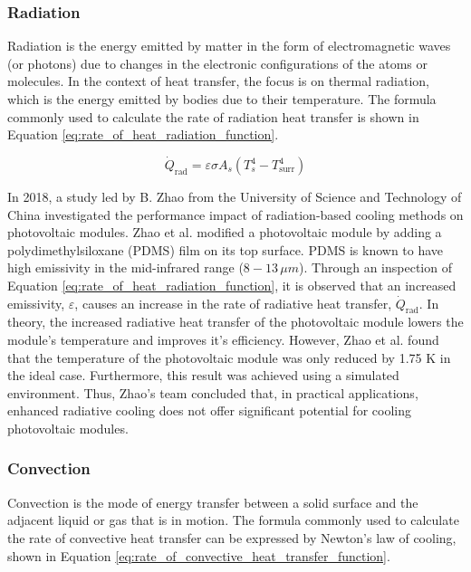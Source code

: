 \subsubsection{Radiation}
Radiation is the energy emitted by matter in the form of electromagnetic waves (or photons) due to changes in the electronic configurations of the atoms or molecules. In the context of heat transfer, the focus is on thermal radiation, which is the energy emitted by bodies due to their temperature. The formula commonly used to calculate the rate of radiation heat transfer is shown in Equation \ref{eq:rate_of_heat_radiation_function}. \cite{Cengel2014IntroductionConcepts}

\begin{equation}
    \dot{Q}_\text{rad} = \varepsilon\sigma A_s (T_s^4-T_\text{surr}^4)
    \label{eq:rate_of_heat_radiation_function}
\end{equation}

In 2018, a study led by B. Zhao from the University of Science and Technology of China investigated the performance impact of radiation-based cooling methods on photovoltaic modules. Zhao et al. modified a photovoltaic module by adding a polydimethylsiloxane (PDMS) film on its top surface. PDMS is known to have high emissivity in the mid-infrared range ($8-13\,\mu m$). \cite{Song2020UltrahighRegime} Through an inspection of Equation \ref{eq:rate_of_heat_radiation_function}, it is observed that an increased emissivity, $\varepsilon$, causes an increase in the rate of radiative heat transfer, $\dot{Q}_\text{rad}$. In theory, the increased radiative heat transfer of the photovoltaic module lowers the module's temperature and improves it's efficiency. However, Zhao et al. found that the temperature of the photovoltaic module was only reduced by 1.75 K in the ideal case. Furthermore, this result was achieved using a simulated environment. Thus, Zhao's team concluded that, in practical applications, enhanced radiative cooling does not offer significant potential for cooling photovoltaic modules. \cite{Zhao2018PerformanceModule}\vspace{0.5em}


\subsubsection{Convection}
Convection is the mode of energy transfer between a solid surface and the adjacent liquid or gas that is in motion. The formula commonly used to calculate the rate of convective heat transfer can be expressed by Newton's law of cooling, shown in Equation \ref{eq:rate_of_convective_heat_transfer_function}. \cite{Cengel2014IntroductionConcepts}

